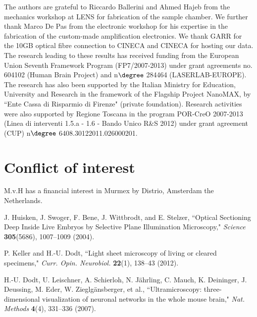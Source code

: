 \documentclass[12pt]{spieman}  %
\begin{document}
\begin{spacing}{2}
\acknowledgments
The authors are grateful to Riccardo Ballerini and Ahmed Hajeb from the mechanics workshop at LENS for fabrication of the sample chamber. We further thank Marco De Pas from the electronic workshop for his expertise in the fabrication of the custom-made amplification electronics. We thank GARR for the 10GB optical fibre connection to CINECA and  CINECA for hosting our data.\\ 
The research leading to these results has received funding from the European Union Seventh Framework Program (FP7\slash2007-2013) under grant agreements no. 604102 (Human Brain Project) and n$\degree$ 284464 (LASERLAB-EUROPE). The research has also been supported by the Italian Ministry for Education, University and Research in the framework of the Flagship Project NanoMAX, by  ``Ente Cassa di Risparmio di Firenze" (private foundation). Research activities were also supported by Regione Toscana in the program POR-CreO 2007-2013 (Linea di interventi 1.5.a - 1.6 - Bando Unico R\&S 2012) under grant agreement (CUP) n$\degree$ 6408.30122011.026000201. 

\section*{Conflict of interest}
M.v.H has a financial interest in Murmex by Distrio, Amsterdam the Netherlands.



\begin{thebibliography}{0}

 J. Huisken, J. Swoger, F. Bene, J. Wittbrodt, and E. Stelzer, ``Optical Sectioning Deep Inside Live Embryos by Selective Plane Illumination Microscopy," \emph{Science} \textbf{305}(5686), 1007–1009 (2004). 

 P. Keller and H.-U. Dodt, ``Light sheet microscopy of living or cleared specimens," \emph{Curr. Opin. Neurobiol.} \textbf{22}(1), 138–43 (2012). 

 H.-U. Dodt, U. Leischner, A. Schierloh, N. J\"{a}hrling, C. Mauch, K. Deininger, J. Deussing, M. Eder, W. Zieglg\"{a}nsberger, et al., ``Ultramicroscopy: three-dimensional visualization of neuronal networks in the whole mouse brain," \emph{Nat. Methods} \textbf{4}(4), 331–336 (2007). 


\end{thebibliography}
\end{spacing}
\end{document}
